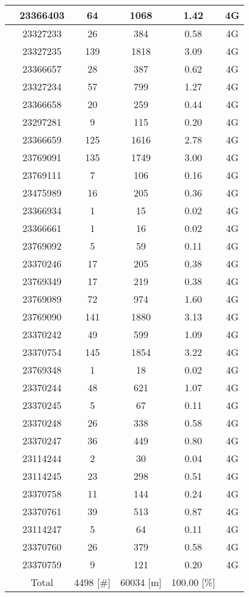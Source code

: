 \begin{longtable*}{|c|c|c|c|c|c|}
 &23366403&64&1068&1.42&4G\\\hline
{} &23327233&26&384&0.58&4G\\\hline
{} &23327235&139&1818&3.09&4G\\\hline
{} &23366657&28&387&0.62&4G\\\hline
{} &23327234&57&799&1.27&4G\\\hline
{} &23366658&20&259&0.44&4G\\\hline
{} &23297281&9&115&0.20&4G\\\hline
{} &23366659&125&1616&2.78&4G\\\hline
{} &23769091&135&1749&3.00&4G\\\hline
{} &23769111&7&106&0.16&4G\\\hline
{} &23475989&16&205&0.36&4G\\\hline
{} &23366934&1&15&0.02&4G\\\hline
{} &23366661&1&16&0.02&4G\\\hline
{} &23769092&5&59&0.11&4G\\\hline
{} &23370246&17&205&0.38&4G\\\hline
{} &23769349&17&219&0.38&4G\\\hline
{} &23769089&72&974&1.60&4G\\\hline
{} &23769090&141&1880&3.13&4G\\\hline
{} &23370242&49&599&1.09&4G\\\hline
{} &23370754&145&1854&3.22&4G\\\hline
{} &23769348&1&18&0.02&4G\\\hline
{} &23370244&48&621&1.07&4G\\\hline
{} &23370245&5&67&0.11&4G\\\hline
{} &23370248&26&338&0.58&4G\\\hline
{} &23370247&36&449&0.80&4G\\\hline
{} &23114244&2&30&0.04&4G\\\hline
{} &23114245&23&298&0.51&4G\\\hline
{} &23370758&11&144&0.24&4G\\\hline
{} &23370761&39&513&0.87&4G\\\hline
{} &23114247&5&64&0.11&4G\\\hline
{} &23370760&26&379&0.58&4G\\\hline
{} &23370759&9&121&0.20&4G\\\hline
{} &Total&4498 [\#]&60034 [m]&100.00 [\%]&\\\hline
\end{longtable*}
